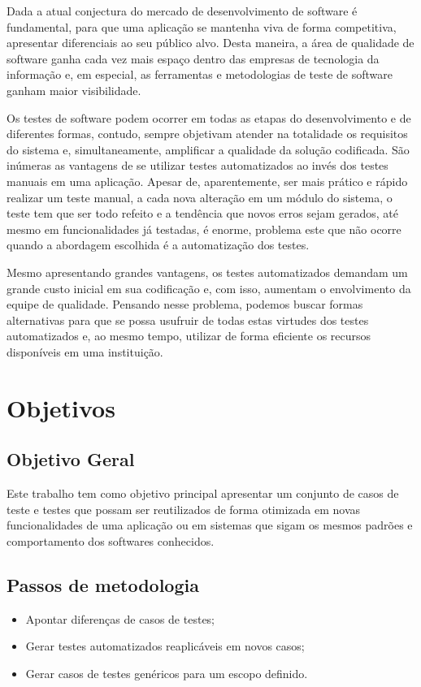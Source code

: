 \documentclass[tg]{mdtufsm}
\begin{document}
Dada a atual conjectura do mercado de desenvolvimento de software é fundamental, para
que uma aplicação se mantenha viva de forma competitiva, apresentar diferenciais ao seu público alvo. Desta
maneira, a área de qualidade de software ganha cada vez mais espaço dentro das empresas de tecnologia da informação e, em especial, as ferramentas e
metodologias de teste de software ganham maior visibilidade.

Os testes de software podem ocorrer em todas as etapas do desenvolvimento e de diferentes formas, contudo,
sempre objetivam atender na totalidade os requisitos do sistema e, simultaneamente, amplificar a qualidade da solução
codificada. São inúmeras as vantagens de se utilizar testes automatizados ao invés dos testes manuais em uma aplicação.
Apesar de, aparentemente, ser mais prático e rápido realizar um teste manual, a cada nova alteração em um módulo do sistema,
o teste tem que ser todo refeito e a tendência que novos erros sejam gerados, até mesmo em funcionalidades já testadas, é enorme,
problema este que não ocorre quando a abordagem escolhida é a automatização dos testes.

Mesmo apresentando grandes vantagens, os testes automatizados demandam um grande custo inicial em sua codificação e, com isso, aumentam o
envolvimento da equipe de qualidade. Pensando nesse problema, podemos buscar formas alternativas para
que se possa usufruir de todas estas virtudes dos testes automatizados e, ao mesmo tempo, utilizar de forma eficiente os
recursos disponíveis em uma instituição.

\section{Objetivos}

\subsection{Objetivo Geral}

Este trabalho tem como objetivo principal apresentar um conjunto de casos de teste e testes que possam ser reutilizados de
forma otimizada em novas funcionalidades de uma aplicação ou em sistemas que sigam os mesmos padrões e comportamento dos
softwares conhecidos.

\subsection{Passos de metodologia}
\begin{itemize}
	\item Apontar diferenças de casos de testes;
    \item Gerar testes automatizados reaplicáveis em novos casos;
    \item Gerar casos de testes genéricos para um escopo definido.
\end{itemize}
\end{document}
